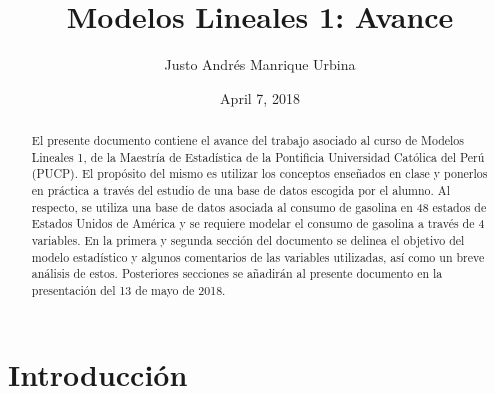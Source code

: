 \documentclass[%
reprint,
 amsmath,amssymb,
 aps,
]{revtex4-1}
\begin{document}

\title{Modelos Lineales 1: Avance}%

\author{Justo Andr\'es Manrique Urbina }
%

\date{April 7, 2018}%

\begin{abstract}
El presente documento contiene el avance del trabajo asociado al curso de Modelos Lineales 1, de la Maestr\'ia de Estad\'istica de la Pontificia Universidad Cat\'olica del Per\'u (PUCP). El prop\'osito del mismo es utilizar los conceptos ense\~nados en clase y ponerlos en pr\'actica a trav\'es del estudio de una base de datos escogida por el alumno. Al respecto, se utiliza una base de datos asociada al consumo de gasolina en 48 estados de Estados Unidos de Am\'erica y se requiere modelar el consumo de gasolina a trav\'es de 4 variables. En la primera y segunda secci\'on del documento se delinea el objetivo del modelo estad\'istico y algunos comentarios de las variables utilizadas, as\'i como un breve an\'alisis de estos. Posteriores secciones se a\~nadir\'an al presente documento en la presentaci\'on del 13 de mayo de 2018.
\end{abstract}

\maketitle


\section{\label{sec:level1}Introducci\'on}
\end{document}
